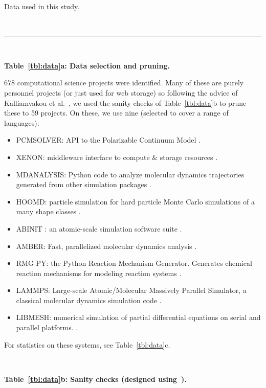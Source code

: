 \documentclass[10pt,journal,compsoc]{IEEEtran}
\newcommand{\bi}{\begin{itemize}[leftmargin=0.4cm]}
\newcommand{\ei}{\end{itemize}}
\newcommand{\tbl}[1]{Table~\ref{tbl:#1}}
\begin{document}
\begin{table}[!t]
\caption{Data used in this study.}\label{tbl:data}
\vspace{-5pt}
~\hrule~
\vspace{1.5mm}

\begin{minipage}{.45\linewidth}
{\bf         \tbl{data}a: Data selection and pruning.}
 
 
678 computational science projects were identified.
Many of these are purely personnel projects (or just used for web storage)
so following the advice of Kalliamvakou et al.~\cite{Kalliamvakou:2014}, we used the sanity
checks of         \tbl{data}b to prune these  to 59 projects.
On these, we  use nine  (selected to cover a range of languages):
\bi
\item PCMSOLVER:   API to the Polarizable Continuum Model \cite{pcmsolver}.
\item XENON: middleware      interface to  compute \& storage resources \cite{xenon}.

\item MDANALYSIS: Python code to analyze molecular dynamics trajectories generated  from other simulation packages \cite{mdanalysis}.
\item  HOOMD:  particle simulation  for  hard particle Monte Carlo simulations of a many shape classes  \cite{hoomd}.  
\item ABINIT  : an atomic-scale simulation software suite \cite{Abinit}.
\item  AMBER: Fast, parallelized molecular dynamics   analysis \cite{Amber-MD}.

\item  RMG-PY: the Python Reaction Mechanism Generator.  Generates chemical reaction mechanisms for modeling reaction systems \cite{ReactionMechanismGenerator}.
\item LAMMPS: Large-scale Atomic/Molecular Massively Parallel Simulator, a classical molecular dynamics simulation code \cite{lammps-sandia}.
\item LIBMESH:   numerical simulation of partial differential equations   on serial and parallel platforms.  \cite{libMesh}.
\ei
For statistics on these systems, see         \tbl{data}c.

\end{minipage}~~~~\begin{minipage}{.55\linewidth}
 \begin{center}
{\bf    \tbl{data}b: Sanity checks (designed using~\cite{Kalliamvakou:2014}).}



\end{center}
\end{minipage}
\end{table}
\end{document}
